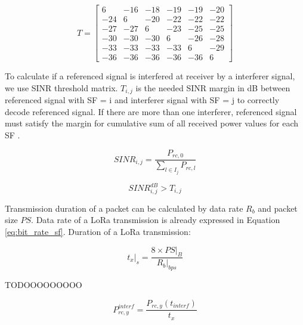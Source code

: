 \documentclass[conference]{IEEEtran}
\begin{document}
\begin{equation} \label{eq:sinr}
T = \begin{bmatrix}
       6 & -16 & -18 & -19 & -19 & -20 \\
     -24 &   6 & -20 & -22 & -22 & -22 \\
     -27 & -27 &   6 & -23 & -25 & -25 \\
     -30 & -30 & -30 &   6 & -26 & -28 \\
     -33 & -33 & -33 & -33 &   6 & -29 \\
     -36 & -36 & -36 & -36 & -36 &   6
     \end{bmatrix}
\end{equation}

\par To calculate if a referenced signal is interfered at receiver by a interferer signal, we use SINR threshold matrix. $T_{i,j}$ is the needed SINR margin in dB between referenced signal with SF = i and interferer signal with SF = j to correctly decode referenced signal. If there are more than one interferer, referenced signal must satisfy the margin for cumulative sum of all received power values for each SF \cite{7996384}.

\begin{equation} \label{eq:sinr_db}
SINR_{i,j} = \dfrac{P_{rc,0}}{\sum_{l \in I_j} P_{rc,l}}
\end{equation}

\par 

\begin{equation} \label{eq:sinr_t}
SINR_{i,j}^{dB} > T_{i,j}
\end{equation}

\par Transmission duration of a packet can be calculated by data rate $R_{b}$ and packet size $PS$. Data rate of a LoRa transmission is already expressed in Equation \ref{eq:bit_rate_sf}. Duration of a LoRa transmission:

\begin{equation} \label{eq:transmission_duration}
t_{x}|_{s} = \dfrac{8 \times PS|_{B}}{R_{b}|_{bps}}
\end{equation}

\par TODOOOOOOOOO

\begin{equation} \label{eq:p_interference}
P_{rc,y}^{interf} = \dfrac{P_{rc,y}(t_{interf})}{t_{x}}
\end{equation}
\end{document}
